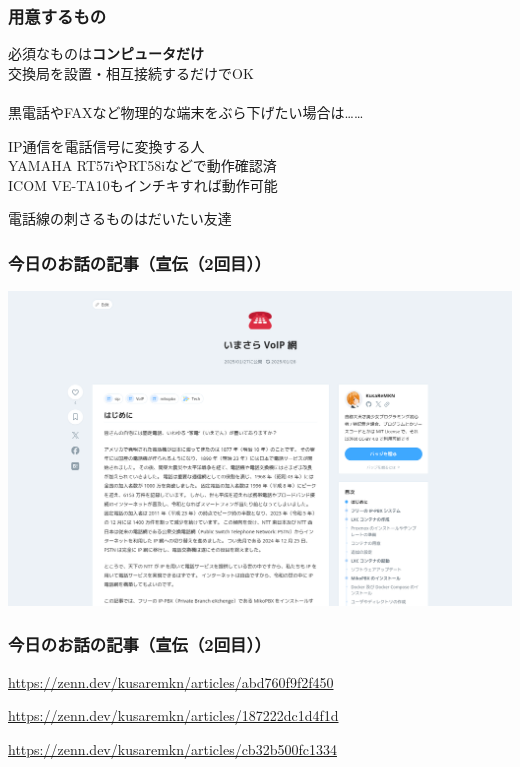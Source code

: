 \documentclass[
  lualatex,
  aspectratio=169,
  14pt
]{beamer}
\begin{document}
\begin{frame}
  \frametitle{用意するもの}

  必須なものは\textbf{コンピュータだけ}\\
  \hspace{1.5\zw}交換局を設置・相互接続するだけでOK
  \\~\\[-.5\baselineskip]

  黒電話やFAXなど物理的な端末をぶら下げたい場合は……

  \begin{description}[labelwidth=\linewidth]
    \item[VoIPルータ（ゲートウェイ？）]
      IP通信を電話信号に変換する人\\
      YAMAHA RT57iやRT58iなどで動作確認済\\
      ICOM VE-TA10もインチキすれば動作可能
    \item[端末それ自体]
      電話線の刺さるものはだいたい友達
  \end{description}
\end{frame}

\begin{frame}
  \frametitle{今日のお話の記事（宣伝（2回目））}

  \includegraphics[width=\linewidth]{./images/imasara.png}
\end{frame}

\begin{frame}
  \frametitle{今日のお話の記事（宣伝（2回目））}

  \begin{description}[labelwidth=\linewidth,itemsep=\zh]
    \item[いまさらVoIP網]
      {\small
      \url{https://zenn.dev/kusaremkn/articles/abd760f9f2f450}}
    \item[VoIPルータを使って黒電話をIP電話機にする]
      {\small
      \url{https://zenn.dev/kusaremkn/articles/187222dc1d4f1d}}
    \item[ICOM VE-TA10を使うためにパケットを書き換えたりする]
      {\small
      \url{https://zenn.dev/kusaremkn/articles/cb32b500fc1334}}
  \end{description}
\end{frame}
\end{document}

